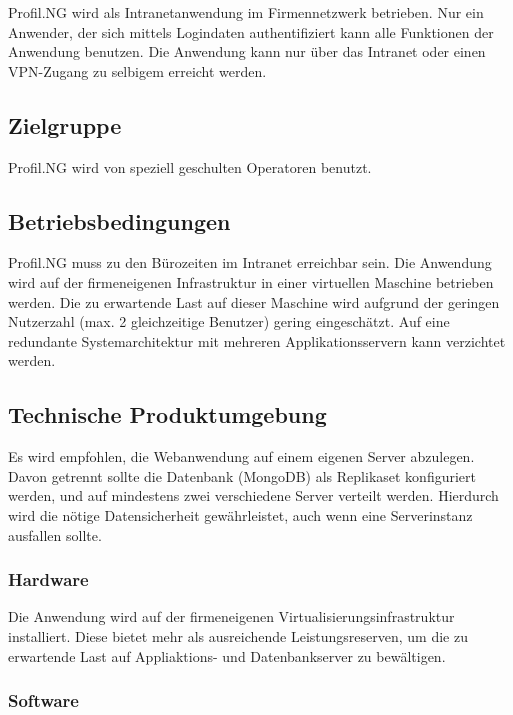 Profil.NG wird als Intranetanwendung im Firmennetzwerk betrieben. Nur ein
Anwender, der sich mittels Logindaten authentifiziert kann alle Funktionen der
Anwendung benutzen. Die Anwendung kann nur über das Intranet oder einen
VPN-Zugang zu selbigem erreicht werden.

\subsection{Zielgruppe}

Profil.NG wird von speziell geschulten Operatoren benutzt.

\subsection{Betriebsbedingungen}

Profil.NG muss zu den Bürozeiten im Intranet erreichbar sein. Die Anwendung wird
auf der firmeneigenen Infrastruktur in einer virtuellen Maschine betrieben
werden. Die  zu erwartende Last auf dieser Maschine wird aufgrund der geringen
Nutzerzahl (max. 2 gleichzeitige Benutzer) gering eingeschätzt. Auf eine
redundante Systemarchitektur mit mehreren Applikationsservern kann verzichtet
werden.

\subsection{Technische Produktumgebung}

Es wird empfohlen, die Webanwendung auf einem eigenen Server abzulegen. Davon
getrennt sollte die Datenbank (MongoDB) als Replikaset konfiguriert werden, und
auf mindestens zwei verschiedene Server verteilt werden. Hierdurch wird die
nötige Datensicherheit gewährleistet, auch wenn eine Serverinstanz ausfallen
sollte.

\subsubsection{Hardware}

Die Anwendung wird auf der firmeneigenen Virtualisierungsinfrastruktur
installiert. Diese bietet mehr als ausreichende Leistungsreserven, um die zu
erwartende Last auf Appliaktions- und Datenbankserver zu bewältigen.

\subsubsection{Software}

